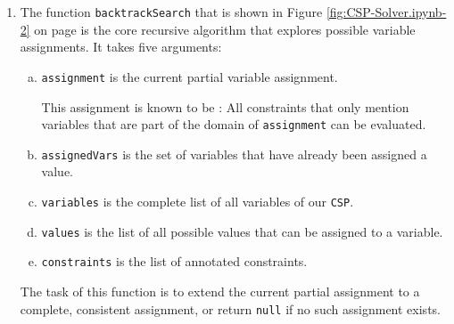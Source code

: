 \begin{enumerate}
\item The function \texttt{backtrackSearch} that is shown in Figure \ref{fig:CSP-Solver.ipynb-2} on page
  \pageref{fig:CSP-Solver.ipynb-2} is the core recursive algorithm that explores possible variable
  assignments. It takes five arguments: 
  \begin{enumerate}[(a)]
  \item \texttt{assignment} is the current partial variable assignment.

    This assignment is known to be : All constraints that only mention variables that
    are part of the domain of \texttt{assignment} can be evaluated.
  \item \texttt{assignedVars} is the set of variables that have already been assigned a value.
  \item \texttt{variables} is the complete list of all variables of our \texttt{CSP}.
  \item \texttt{values} is the list of all possible values that can be assigned to a variable.
  \item \texttt{constraints} is the list of annotated constraints.
  \end{enumerate}
  The task of this function is to extend the current partial assignment to a complete, consistent assignment, or return \texttt{null} if no such assignment exists.


\end{enumerate}
